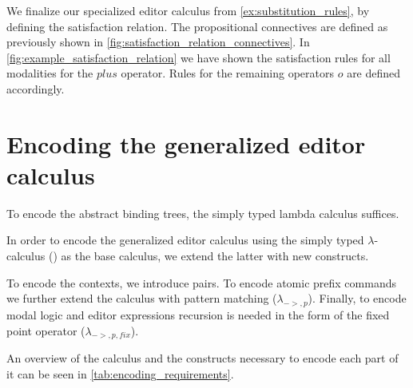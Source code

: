 \documentclass[sigplan,anonymous,review]{acmart}
\begin{document}
\begin{example}\label{ex:modal_logic}
    We finalize our specialized editor calculus from \cref{ex:substitution_rules}, by defining the satisfaction relation. The propositional connectives are defined as previously shown in \cref{fig:satisfaction_relation_connectives}. In \cref{fig:example_satisfaction_relation} we have shown the satisfaction rules for all modalities for the $plus$ operator. Rules for the remaining operators $o$ are defined accordingly.
\end{example}

\section{Encoding the generalized editor calculus} \label{sec:encoding}

To encode the abstract binding trees, the simply typed lambda calculus
suffices.

In order to encode the generalized editor calculus using the simply
typed $\lambda$-calculus (\stlc) as the base calculus, we extend the
latter with new constructs.

To encode the contexts, we introduce pairs. To encode atomic prefix
commands we further extend the calculus with pattern matching
($\lambda_{->,p}$). Finally, to encode modal logic and editor
expressions recursion is needed in the form of the fixed point
operator ($\lambda_{->,p,fix}$).

An overview of the calculus and the constructs necessary to encode
each part of it can be seen in \cref{tab:encoding_requirements}.
\end{document}
